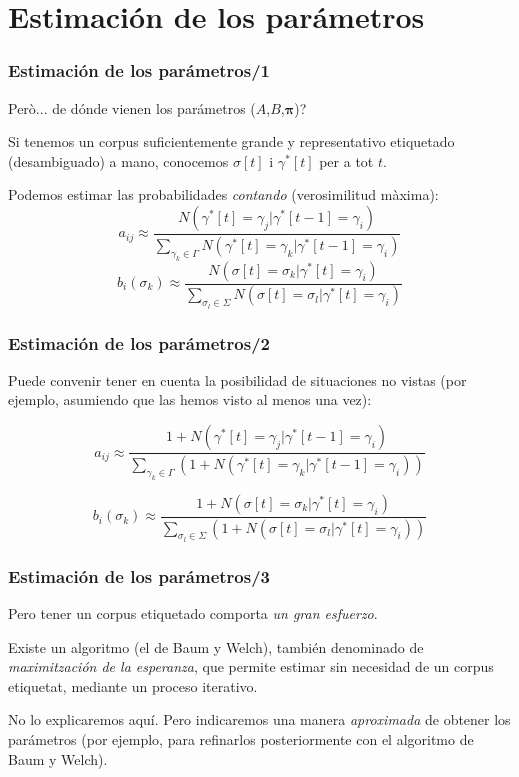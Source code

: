 \documentclass{beamer}
\begin{document}
\section{Estimación de los parámetros}
\begin{frame}
\frametitle{ Estimación de los parámetros/1}

{
{Però... de dónde vienen los parámetros (\(A\),\(B\),\(\mathbf{\pi}\))?}

{Si tenemos un corpus suficientemente grande y representativo  etiquetado (desambiguado) a mano, 
conocemos \(\sigma[t]\) i \(\gamma^*[t]\) per a tot \(t\). }

{Podemos estimar las probabilidades \emph{contando} (verosimilitud màxima):
\[ a_{ij}\approx \frac{N(\gamma^*[t]=\gamma_j|\gamma^*[t-1]=\gamma_i)}
                     {\sum_{\gamma_k\in\Gamma} N(\gamma^*[t]=\gamma_k|\gamma^*[t-1]=\gamma_i)}  \]
\[ b_{i}(\sigma_k)  \approx
\frac{N(\sigma[t]=\sigma_k|\gamma^*[t]=\gamma_i)}
     {\sum_{\sigma_l\in\Sigma} N(\sigma[t]=\sigma_l|\gamma^*[t]=\gamma_i)} \]         
}
}
\end{frame}
\begin{frame}
\frametitle{ Estimación de los parámetros/2}

{
{Puede convenir tener en cuenta la posibilidad de situaciones no vistas (por ejemplo, asumiendo que las hemos visto al menos una vez):}

{\[ a_{ij}\approx \frac{1+ N(\gamma^*[t]=\gamma_j|\gamma^*[t-1]=\gamma_i)}
                     {\sum_{\gamma_k\in\Gamma} \left(1+
                     N(\gamma^*[t]=\gamma_k|\gamma^*[t-1]=\gamma_i)\right)
                     }\]}


{\[ b_{i}(\sigma_k)  \approx
\frac{1+N(\sigma[t]=\sigma_k|\gamma^*[t]=\gamma_i)}
     {\sum_{\sigma_l\in\Sigma} \left(1+ 
N(\sigma[t]=\sigma_l|\gamma^*[t]=\gamma_i) \right)} \]}


}
\end{frame}
\begin{frame}
\frametitle{ Estimación de los parámetros/3}

{
{Pero tener un corpus etiquetado comporta \emph{un gran esfuerzo}.}

{Existe un algoritmo (el de Baum y Welch), también denominado de
  \emph{maximitzación de la esperanza}, que permite estimar sin necesidad de un corpus etiquetat, mediante un proceso iterativo.}

{No lo explicaremos aquí. Pero indicaremos una manera
  \emph{aproximada} de obtener los parámetros (por ejemplo, para
  refinarlos posteriormente con el algoritmo de Baum y Welch).}
}
\end{frame}
\end{document}
